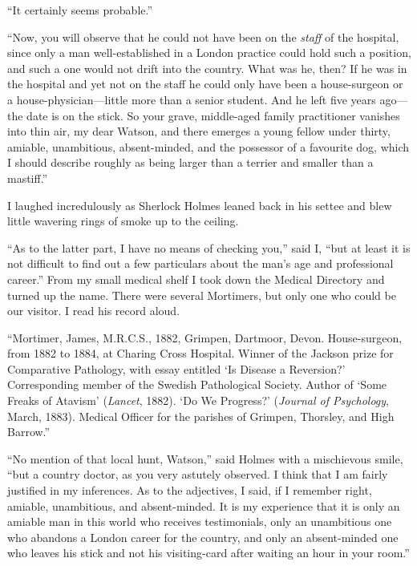 \documentclass[paper=a5,BCOR=7mm,twoside,DIV=calc,12pt,usegeometry,openany,chapterprefix,endperiod,headings=big]{scrbook} %
\begin{document}
\enquote{It certainly seems probable.}

\enquote{Now, you will observe that he could not have been on the \emph{staff} of the hospital, since only a man well-established in a London practice could hold such a position, and such a one would not drift into the country. What was he, then? If he was in the hospital and yet not on the staff he could only have been a house-surgeon or a house-physician---little more than a senior student. And he left five years ago---the date is on the stick. So your grave, middle-aged family practitioner vanishes into thin air, my dear Watson, and there emerges a young fellow under thirty, amiable, unambitious, absent-minded, and the possessor of a favourite dog, which I should describe roughly as being larger than a terrier and smaller than a mastiff.}

I laughed incredulously as Sherlock Holmes leaned back in his settee and blew little wavering rings of smoke up to the ceiling.

\enquote{As to the latter part, I have no means of checking you,} said I, \enquote{but at least it is not difficult to find out a few particulars about the man's age and professional career.} From my small medical shelf I took down the Medical Directory and turned up the name. There were several Mortimers, but only one who could be our visitor. I read his record aloud.

\enquote{Mortimer, James, M.R.C.S., 1882, Grimpen, Dartmoor, Dev\-on. House-surgeon, from 1882 to 1884, at Charing Cross Hospital. Winner of the Jackson prize for Comparative Pathology, with essay entitled \enquote{Is Disease a Reversion?} Corresponding member of the Swedish Pathological Society. Author of \enquote{Some Freaks of Atavism} (\textit{Lancet}, 1882). \enquote{Do We Progress?} (\textit{Journal of Psychology}, March, 1883). Medical Officer for the parishes of Grimpen, Thorsley, and High Barrow.}

\enquote{No mention of that local hunt, Watson,} said Holmes with a mischievous smile, \enquote{but a country doctor, as you very astutely observed. I think that I am fairly justified in my inferences. As to the adjectives, I said, if I remember right, amiable, unambitious, and absent-minded. It is my experience that it is only an amiable man in this world who receives testimonials, only an unambitious one who abandons a London career for the country, and only an absent-minded one who leaves his stick and not his visiting-card after waiting an hour in your room.}
\end{document}
